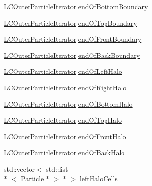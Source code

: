 \begin{DoxyCompactItemize}
\item 
\hyperlink{classutils_1_1LCOuterParticleIterator}{L\-C\-Outer\-Particle\-Iterator} \hyperlink{classutils_1_1LCParticleContainer_a0d03390f7f466d6c4b7fcf17ad9e3bf2}{end\-Of\-Bottom\-Boundary}
\item 
\hyperlink{classutils_1_1LCOuterParticleIterator}{L\-C\-Outer\-Particle\-Iterator} \hyperlink{classutils_1_1LCParticleContainer_a9aa07f3bba36c2c40f9b3c21bd6faddd}{end\-Of\-Top\-Boundary}
\item 
\hyperlink{classutils_1_1LCOuterParticleIterator}{L\-C\-Outer\-Particle\-Iterator} \hyperlink{classutils_1_1LCParticleContainer_a517ee61378d57e081be50de7f7feade8}{end\-Of\-Front\-Boundary}
\item 
\hyperlink{classutils_1_1LCOuterParticleIterator}{L\-C\-Outer\-Particle\-Iterator} \hyperlink{classutils_1_1LCParticleContainer_a7c3ffe4e29090f2e9c15404d862a7c00}{end\-Of\-Back\-Boundary}
\item 
\hyperlink{classutils_1_1LCOuterParticleIterator}{L\-C\-Outer\-Particle\-Iterator} \hyperlink{classutils_1_1LCParticleContainer_a86ea17dc08f3a1ff1a20b85c8b39f800}{end\-Of\-Left\-Halo}
\item 
\hyperlink{classutils_1_1LCOuterParticleIterator}{L\-C\-Outer\-Particle\-Iterator} \hyperlink{classutils_1_1LCParticleContainer_aebb9ebf1fd5285b71814f76fc3b5b1da}{end\-Of\-Right\-Halo}
\item 
\hyperlink{classutils_1_1LCOuterParticleIterator}{L\-C\-Outer\-Particle\-Iterator} \hyperlink{classutils_1_1LCParticleContainer_a7ce450071fe63f6beddb5b0e7a28c1a7}{end\-Of\-Bottom\-Halo}
\item 
\hyperlink{classutils_1_1LCOuterParticleIterator}{L\-C\-Outer\-Particle\-Iterator} \hyperlink{classutils_1_1LCParticleContainer_a67adece44e79bc57ac15202d03420d32}{end\-Of\-Top\-Halo}
\item 
\hyperlink{classutils_1_1LCOuterParticleIterator}{L\-C\-Outer\-Particle\-Iterator} \hyperlink{classutils_1_1LCParticleContainer_a39d3733293da9c8b9b1b7bbcbfb072fa}{end\-Of\-Front\-Halo}
\item 
\hyperlink{classutils_1_1LCOuterParticleIterator}{L\-C\-Outer\-Particle\-Iterator} \hyperlink{classutils_1_1LCParticleContainer_ad6ea327b4bf6998984247ae23fbf7f4e}{end\-Of\-Back\-Halo}
\item 
std\-::vector$<$ std\-::list\\*
$<$ \hyperlink{classParticle}{Particle} $\ast$ $>$ $\ast$ $>$ \hyperlink{classutils_1_1LCParticleContainer_a07197daadd51dcbb52f767e2dad0f68f}{left\-Halo\-Cells}

\end{DoxyCompactItemize}
